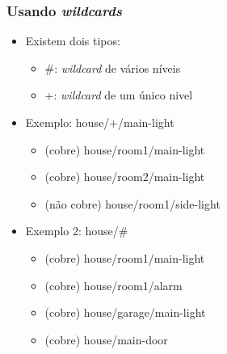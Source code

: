 \documentclass{beamer}
\begin{document}

\begin{frame}
\frametitle{Usando \emph{wildcards}}

\begin{itemize}

\item Existem dois tipos:

\begin{itemize}
\item \#: \emph{wildcard} de vários níveis
\item +: \emph{wildcard} de um único nivel
\end{itemize}

\item Exemplo: house/+/main-light

\begin{itemize}
\item (cobre) house/room1/main-light
\item (cobre) house/room2/main-light
\item (não cobre) house/room1/side-light
\end{itemize}

\item Exemplo 2: house/\#
\begin{itemize}
\item (cobre) house/room1/main-light
\item (cobre) house/room1/alarm
\item (cobre) house/garage/main-light
\item (cobre) house/main-door
\end{itemize}
\end{itemize}

\end{frame}
\end{document}
